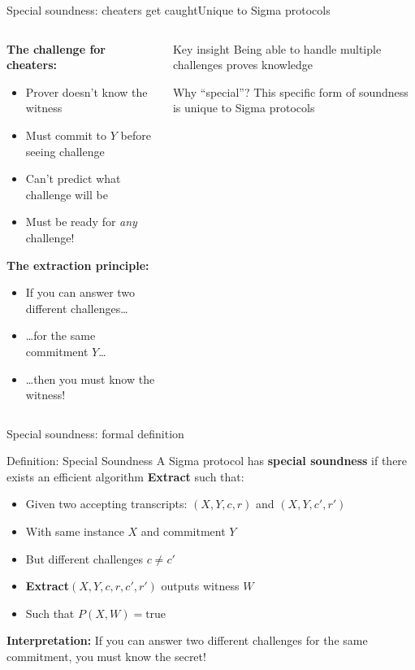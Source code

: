 \documentclass[aspectratio=169, lualatex, handout]{beamer}
\begin{document}
\begin{frame}{Special soundness: cheaters get caught}{Unique to Sigma protocols}
	\begin{columns}[c]
		\begin{column}{0.6\textwidth}
			\textbf{The challenge for cheaters:}
			\begin{itemize}
				\item Prover doesn't know the witness
				\item Must commit to $Y$ before seeing challenge
				\item Can't predict what challenge will be
				\item Must be ready for \textit{any} challenge!
			\end{itemize}
			\vspace{0.5em}
			\textbf{The extraction principle:}
			\begin{itemize}
				\item If you can answer two different challenges\ldots
				\item \ldots for the same commitment $Y$\ldots
				\item \ldots then you must know the witness!
			\end{itemize}
		\end{column}
		\begin{column}{0.4\textwidth}
			\begin{alertblock}{Key insight}
				Being able to handle multiple challenges proves knowledge
			\end{alertblock}
			\vspace{0.5em}
			\begin{exampleblock}{Why ``special''?}
				This specific form of soundness is unique to Sigma protocols
			\end{exampleblock}
		\end{column}
	\end{columns}
\end{frame}

\begin{frame}{Special soundness: formal definition}
	\begin{block}{Definition: Special Soundness}
		A Sigma protocol has \textbf{special soundness} if there exists an efficient algorithm \textbf{Extract} such that:
		\begin{itemize}
			\item Given two accepting transcripts: $(X, Y, c, r)$ and $(X, Y, c', r')$
			\item With same instance $X$ and commitment $Y$
			\item But different challenges $c \neq c'$
			\item \textbf{Extract}$(X, Y, c, r, c', r')$ outputs witness $W$
			\item Such that $P(X, W) = \text{true}$
		\end{itemize}
	\end{block}
	\vspace{0.5em}
	\textbf{Interpretation:} If you can answer two different challenges for the same commitment, you must know the secret!
\end{frame}
\end{document}
